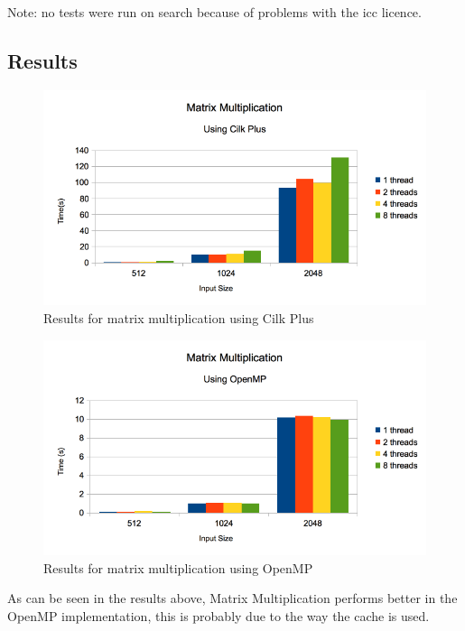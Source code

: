 \documentclass[a4paper,10pt,openright,openbib,twocolumn]{article}
\begin{document}
\footnotesize
Note: no tests were run on search because of problems with the icc licence.
\normalsize


\subsection{Results}

        \begin{figure}[H]
            \centering
            \includegraphics[scale=0.45]{images/matmultcilk.png}
            \caption{Results for matrix multiplication using Cilk Plus}
            \label{roofline}
        \end{figure}
        \begin{figure}[H]
            \centering
            \includegraphics[scale=0.45]{images/matmultopenmp.png}
            \caption{Results for matrix multiplication using OpenMP}
            \label{roofline}
        \end{figure}
        As can be seen in the results above, Matrix Multiplication performs better in the OpenMP implementation, this is probably due to the way the cache is used.\\
\end{document}

